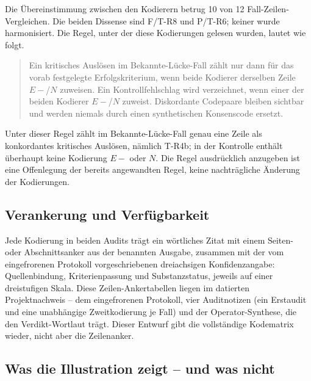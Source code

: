 \documentclass[11pt,a4paper]{article}
\begin{document}
\noindent
Die Übereinstimmung zwischen den Kodierern betrug 10 von 12
Fall-Zeilen-Vergleichen. Die beiden Dissense sind F/T-R8 und P/T-R6; keiner
wurde harmonisiert. Die Regel, unter der diese Kodierungen gelesen wurden,
lautet wie folgt.

\begin{quote}
Ein kritisches Auslösen im Bekannte-Lücke-Fall zählt nur dann für das vorab
festgelegte Erfolgskriterium, wenn beide Kodierer derselben Zeile $E{-}$/$N$
zuweisen. Ein Kontrollfehlschlag wird verzeichnet, wenn einer der beiden
Kodierer $E{-}$/$N$ zuweist. Diskordante Codepaare bleiben sichtbar und
werden niemals durch einen synthetischen Konsenscode ersetzt.
\end{quote}

\noindent
Unter dieser Regel zählt im Bekannte-Lücke-Fall genau eine Zeile als
konkordantes kritisches Auslösen, nämlich T-R4b; in der Kontrolle enthält
überhaupt keine Kodierung $E{-}$ oder $N$. Die Regel ausdrücklich anzugeben
ist eine Offenlegung der bereits angewandten Regel, keine nachträgliche
Änderung der Kodierungen.

\subsection{Verankerung und Verfügbarkeit}\label{sec:anchors}

Jede Kodierung in beiden Audits trägt ein wörtliches Zitat mit einem Seiten-
oder Abschnittsanker aus der benannten Ausgabe, zusammen mit der vom
eingefrorenen Protokoll vorgeschriebenen dreiachsigen Konfidenzangabe:
Quellenbindung, Kriterienpassung und Substanzstatus, jeweils auf einer
dreistufigen Skala. Diese Zeilen-Ankertabellen liegen im datierten
Projektnachweis -- dem eingefrorenen Protokoll, vier Auditnotizen (ein
Erstaudit und eine unabhängige Zweitkodierung je Fall) und der
Operator-Synthese, die den Verdikt-Wortlaut trägt. Dieser Entwurf gibt die
vollständige Kodematrix wieder, nicht aber die Zeilenanker.

\subsection{Was die Illustration zeigt -- und was nicht}
\end{document}
